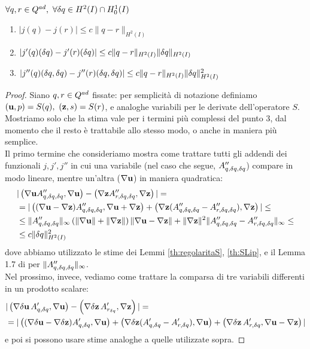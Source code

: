 %
\begin{lemma}
	$\forall q,r\in Q^{ad},\ \forall{\delta q}\in H^2(I)\cap H^1_0(I)$
	\begin{enumerate}
	\item $|j(q)-j(r)|\leq c\|q-r\|_{H^2(I)}$
	\item $|j'(q)({\delta q})-j'(r)({\delta q})|\leq c\|q-r\|_{H^2(I)}\|{\delta q}\|_{H^2(I)}$
	\item $|j''(q)({\delta q},{\delta q})-j''(r)({\delta q},{\delta q})|\leq c\|q-r\|_{H^2(I)}\|{\delta q}\|_{H^2(I)}^2$
	\end{enumerate}
\label{th:jLip}
\end{lemma}
\begin{proof}
	Siano $q,r\in Q^{ad}$ fissate: per semplicità di notazione definiamo $(\mathbf{u},p)=S(q),\ (\mathbf{z},s)=S(r)$, e analoghe variabili per le derivate dell'operatore $S$.
	Mostriamo solo che la stima vale per i termini più complessi del punto 3, dal momento che il resto è trattabile allo stesso modo, o anche in maniera più semplice.\\
	Il primo termine che consideriamo mostra come trattare tutti gli addendi dei funzionali $j,j',j''$ in cui una variabile (nel caso che segue, $A''_{q,{\delta q},{\delta q}}$) compare in modo lineare, mentre un'altra ($\nabla\mathbf{u}$) in maniera quadratica:
	\begin{equation*}\begin{split}
	&|\left(\nabla\mathbf{u} A''_{q,{\delta q},{\delta q}},\nabla\mathbf{u}\right)-\left(\nabla\mathbf{z} A''_{r,{\delta q},{\delta q}},\nabla\mathbf{z}\right)|=\\
	&=|\left((\nabla\mathbf{u}-\nabla\mathbf{z})A''_{q,{\delta q},{\delta q}},\nabla\mathbf{u}+\nabla\mathbf{z}\right)+\left(\nabla\mathbf{z}(A''_{q,{\delta q},{\delta q}}-A''_{r,{\delta q},{\delta q}}),\nabla\mathbf{z}\right)|\leq\\
	&\leq\|A''_{q,{\delta q},{\delta q}}\|_\infty\left(\|\nabla\mathbf{u}\|+\|\nabla\mathbf{z}\|\right)\|\nabla\mathbf{u}-\nabla\mathbf{z}\|+\|\nabla\mathbf{z}\|^2\|A''_{q,{\delta q},{\delta q}}-A''_{r,{\delta q},{\delta q}}\|_\infty\leq\\
	&\leq c\|{\delta q}\|_{H^2(I)}^2
	\end{split}\end{equation*}
	dove abbiamo utilizzato le stime dei Lemmi \ref{th:regolaritaS}, \ref{th:SLip}, e il Lemma 1.7 di \cite{Kinigera} per $\|A''_{q,{\delta q},{\delta q}}\|_\infty$.\\
	Nel prossimo, invece, vediamo come trattare la comparsa di tre variabili differenti in un prodotto scalare:
	\begin{equation*}\begin{split}
	&|\left(\nabla\mathbf{\delta u}\,A'_{q,{\delta q}},\nabla\mathbf{u}\right)-\left(\nabla\delta\mathbf{z}\,A'_{r_{\delta q}},\nabla\mathbf{z}\right)|=\\
	&=|\left((\nabla\mathbf{\delta u}-\nabla\delta\mathbf{z})A'_{q,{\delta q}},\nabla\mathbf{u}\right)+\left(\nabla\delta\mathbf{z}(A'_{q,{\delta q}}-A'_{r,{\delta q}}),\nabla\mathbf{u}\right)+\left(\nabla\delta\mathbf{z}\, A'_{r,{\delta q}},\nabla\mathbf{u}-\nabla\mathbf{z}\right)|
	\end{split}\end{equation*}
	e poi si possono usare stime analoghe a quelle utilizzate sopra.
\end{proof}
